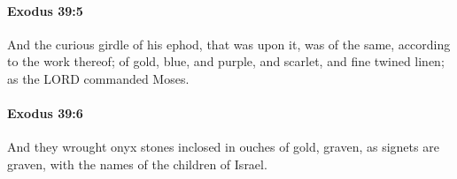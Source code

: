 		\paragraph{Exodus 39:5} %
			\label{EXODUS-39-5}

			And the curious girdle of his ephod, that was upon it, was of the same, according to the work thereof; of gold, blue, and purple, and scarlet, and fine twined linen; as the LORD commanded Moses.


		\paragraph{Exodus 39:6} %
			\label{EXODUS-39-6}

			And they wrought onyx stones inclosed in ouches of gold, graven, as signets are graven, with the names of the children of Israel.



